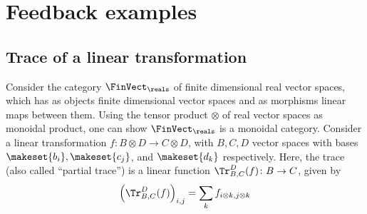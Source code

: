 
\section{Feedback examples}
\publictodomessage


\subsection{Trace of a linear transformation}
\label{subsec:trace-linear}
Consider the category $\FinVect_\reals$ of finite dimensional real vector spaces, which has as objects finite dimensional vector spaces and as morphisms linear maps between them.
Using the tensor product $\otimes$ of real vector spaces as monoidal product, one can show $\FinVect_\reals$ is a monoidal category.
Consider a linear transformation $f\colon B\otimes D\to C\otimes D$, with $B,C,D$ vector spaces with bases $\makeset{b_i},\makeset{c_j}$, and $\makeset{d_k}$ respectively.
Here, the trace (also called ``partial trace'') is a linear function $\Tr_{B,C}
    ^D(f)\colon B\to C$, given by
\begin{equation}
    \left(\Tr_{B,C}
    ^D(f) \right)_{i,j}=\sum_{k}f_{i\otimes k,j\otimes k}
\end{equation}

